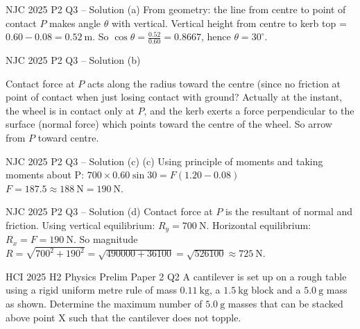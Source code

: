 \documentclass[11pt]{beamer}
\begin{document}
\begin{frame}{NJC 2025 P2 Q3 – Solution (a)}
From geometry: the line from centre to point of contact $P$ makes angle $\theta$ with vertical. Vertical height from centre to kerb top = $0.60 - 0.08 = 0.52\ \mathrm{m}$. So $\cos\theta = \frac{0.52}{0.60} = 0.8667$, hence $\theta = 30^\circ$.
\end{frame}

\begin{frame}{NJC 2025 P2 Q3 – Solution (b)}
\begin{center}
\end{center}
Contact force at $P$ acts along the radius toward the centre (since no friction at point of contact when just losing contact with ground? Actually at the instant, the wheel is in contact only at $P$, and the kerb exerts a force perpendicular to the surface (normal force) which points toward the centre of the wheel. So arrow from $P$ toward centre.
\end{frame}

\begin{frame}{NJC 2025 P2 Q3 – Solution (c)}
(c) Using principle of moments and taking moments about P:
$700 \times 0.60 \sin 30 = F(1.20 - 0.08)$
$F = 187.5 \approx 188\ \mathrm{N} = 190\ \mathrm{N}$.
\end{frame}

\begin{frame}{NJC 2025 P2 Q3 – Solution (d)}
Contact force at $P$ is the resultant of normal and friction. Using vertical equilibrium: $R_y = 700\ \mathrm{N}$. Horizontal equilibrium: $R_x = F = 190\ \mathrm{N}$. So magnitude $R = \sqrt{700^2 + 190^2} = \sqrt{490000 + 36100} = \sqrt{526100} \approx 725\ \mathrm{N}$.
\end{frame}

\begin{frame}[shrink=15]{HCI 2025 H2 Physics Prelim Paper 2 Q2}
A cantilever is set up on a rough table using a rigid uniform metre rule of mass $0.11\ \mathrm{kg}$, a $1.5\ \mathrm{kg}$ block and a $5.0\ \mathrm{g}$ mass as shown. Determine the maximum number of $5.0\ \mathrm{g}$ masses that can be stacked above point X such that the cantilever does not topple.
\end{frame}
\end{document}
